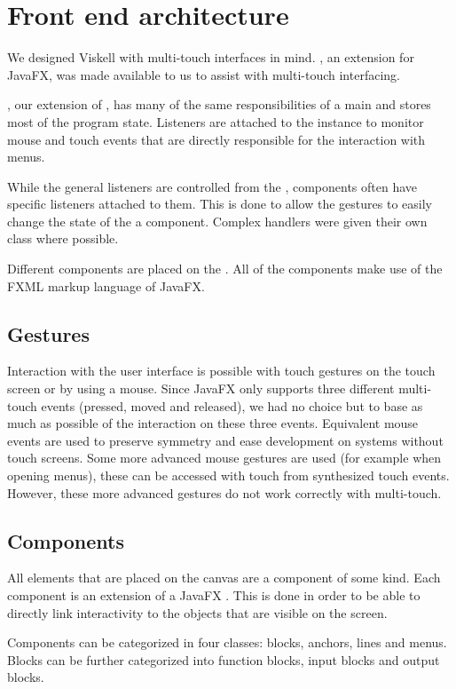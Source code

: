 \section{Front end architecture}
We designed Viskell with multi-touch interfaces in mind. , an extension for JavaFX, was made available to us to assist with multi-touch interfacing.

, our extension of , has many of the same responsibilities of a main  and stores most of the program state.
Listeners are attached to the  instance to monitor mouse and touch events that are directly responsible for the interaction with menus.

While the general listeners are controlled from the , components often have specific listeners attached to them.
This is done to allow the gestures to easily change the state of the a component. Complex handlers were given their own class where possible.

Different components are placed on the . All of the components make use of the FXML markup language of JavaFX.

\subsection{Gestures}
Interaction with the user interface is possible with touch gestures on the touch screen or by using a mouse. Since JavaFX only supports three different multi-touch events (pressed, moved and released), we had no choice but to base as much as possible of the interaction on these three events. Equivalent mouse events are used to preserve symmetry and ease development on systems without touch screens. Some more advanced mouse gestures are used (for example when opening menus), these can be accessed with touch from synthesized touch events. However, these more advanced gestures do not work correctly with multi-touch.

\subsection{Components}
All elements that are placed on the canvas are a component of some kind.
Each component is an extension of a JavaFX . This is done in order to be able to directly link interactivity to the objects that are visible on the screen.

Components can be categorized in four classes: blocks, anchors, lines and menus.
Blocks can be further categorized into function blocks, input blocks and output blocks.

